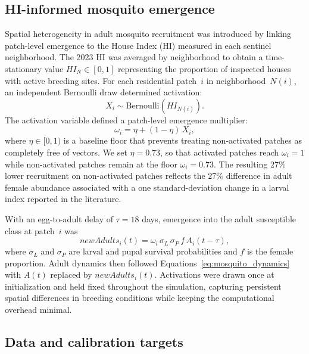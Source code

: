 \documentclass[applsci,article,accept,pdftex,moreauthors]{Definitions/mdpi}
\begin{document}
\subsection{HI-informed mosquito emergence}
\label{sec:hi_emergence}

Spatial heterogeneity in adult mosquito recruitment was introduced by linking patch-level emergence to the House Index (HI) measured in each sentinel neighborhood. The 2023 HI was averaged by neighborhood to obtain a time-stationary value $\mathit{HI}_N \in [0,1]$ representing the proportion of inspected houses with active breeding sites. For each residential patch~$i$ in neighborhood~$N(i)$, an independent Bernoulli draw determined activation:
\begin{equation}
X_i \sim \mathrm{Bernoulli}\!\left(\mathit{HI}_{N(i)}\right).
\label{eq:bernoulli}
\end{equation}
The activation variable defined a patch-level emergence multiplier:
\begin{equation}
\omega_i = \eta + (1-\eta)\,X_i,
\label{eq:omega}
\end{equation}
where $\eta \in [0,1)$ is a baseline floor that prevents treating non-activated patches as completely free of vectors. We set $\eta = 0.73$, so that activated patches reach $\omega_i = 1$ while non-activated patches remain at the floor $\omega_i = 0.73$. The resulting $27\%$ lower recruitment on non-activated patches reflects the $27\%$ difference in adult female abundance associated with a one standard-deviation change in a larval index reported in the literature.

With an egg-to-adult delay of $\tau = 18$ days, emergence into the adult susceptible class at patch~$i$ was
\begin{equation}
\mathit{newAdults}_i(t) = \omega_i\,\sigma_L\,\sigma_P\,f\,A_i(t-\tau),
\label{eq:emergence}
\end{equation}
where $\sigma_L$ and $\sigma_P$ are larval and pupal survival probabilities and $f$ is the female proportion. Adult dynamics then followed Equations~\eqref{eq:mosquito_dynamics} with $A(t)$ replaced by $\mathit{newAdults}_i(t)$. Activations were drawn once at initialization and held fixed throughout the simulation, capturing persistent spatial differences in breeding conditions while keeping the computational overhead minimal.

\subsection{Data and calibration targets}
\label{sec:data}
\end{document}
